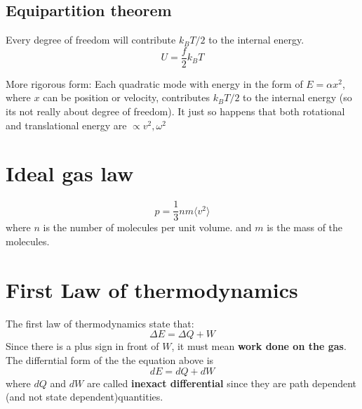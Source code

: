\subsection{Equipartition theorem}
Every degree of freedom will contribute $k_B T/2$ to the internal energy. 
\begin{equation}
    U=\frac{f}{2}k_BT
\end{equation}

More rigorous form: Each quadratic mode with energy in the form of $E=\alpha x^2$, where $x$ can be position or velocity, contributes $k_BT/2$ to the internal energy (so its not really about degree of freedom). It just so happens that both rotational and translational energy are $\propto v^2, \omega^2$

\section{Ideal gas law}
\begin{equation}
    p=\frac{1}{3}n m \langle v^2 \rangle
\end{equation}
where $n$ is the number of molecules per unit volume. and $m$ is the mass of the molecules.

\section{First Law of thermodynamics}
The first law of thermodynamics state that:
\begin{equation}
    \Delta E= \Delta Q + W
\end{equation}
Since there is a plus sign in front of $W$, it must mean \textbf{work done on the gas}.
The differntial form of the the equation above is
\begin{equation}
    dE=dQ+dW
\end{equation}
where $dQ$ and $dW$ are called \textbf{inexact differential} since they are path dependent (and not state dependent)quantities.

